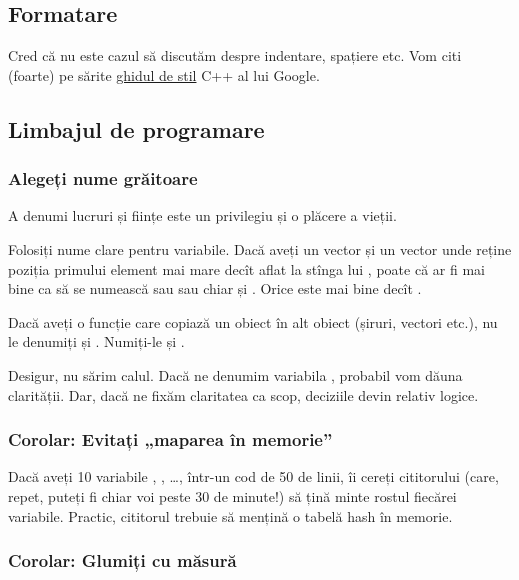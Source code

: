 \documentclass[../main.tex]{subfiles}
\begin{document}
\subsection{Formatare}

Cred că nu este cazul să discutăm despre indentare, spațiere etc. Vom citi (foarte) pe sărite \href{https://google.github.io/styleguide/cppguide.html}{ghidul de stil} C++ al lui Google.

\subsection{Limbajul de programare}

\subsubsection*{Alegeți nume grăitoare}

A denumi lucruri și ființe este un privilegiu și o plăcere a vieții.

Folosiți nume clare pentru variabile. Dacă aveți un vector  și un vector  unde  reține poziția primului element mai mare decît  aflat la stînga lui , poate că ar fi mai bine ca  să se numească  sau  sau chiar și . Orice este mai bine decît .

Dacă aveți o funcție care copiază un obiect în alt obiect (șiruri, vectori etc.), nu le denumiți  și . Numiți-le  și .

Desigur, nu sărim calul. Dacă ne denumim variabila , probabil vom dăuna clarității. Dar, dacă ne fixăm claritatea ca scop, deciziile devin relativ logice.

\subsubsection*{Corolar: Evitați „maparea în memorie”}

Dacă aveți 10 variabile , , \dots,  într-un cod de 50 de linii, îi cereți cititorului (care, repet, puteți fi chiar voi peste 30 de minute!) să țină minte rostul fiecărei variabile. Practic, cititorul trebuie să mențină o tabelă hash în memorie.

\subsubsection*{Corolar: Glumiți cu măsură}
\end{document}
